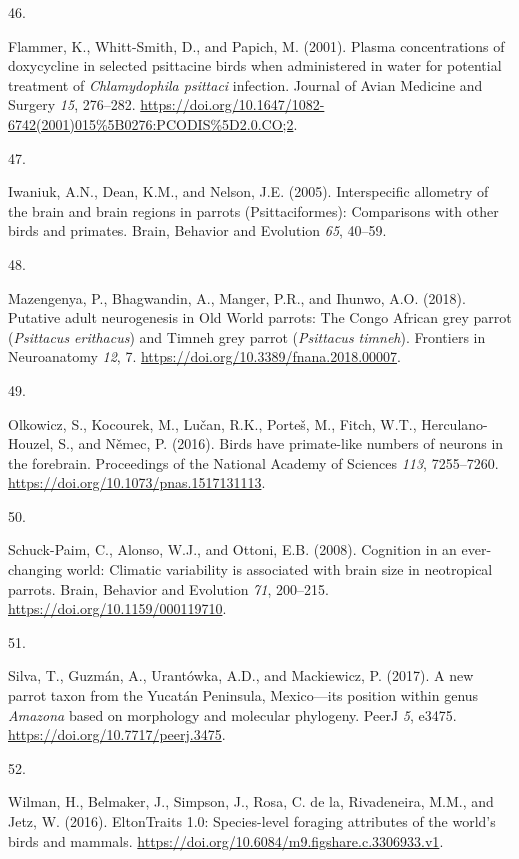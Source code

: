 \documentclass[
  man, donotrepeattitle,floatsintext]{apa6}
\newlength{\cslhangindent}
\newlength{\csllabelwidth}
\newlength{\cslentryspacingunit} %
\newenvironment{CSLReferences}[2] %
 {%
  \setlength{\parindent}{0pt}
  \ifodd #1
  \let\oldpar\par
  \def\par{\hangindent=\cslhangindent\oldpar}
  \fi
  \setlength{\parskip}{#2\cslentryspacingunit}
 }%
 {}
\newcommand{\CSLLeftMargin}[1]{\parbox[t]{\csllabelwidth}{#1}}
\newcommand{\CSLRightInline}[1]{\parbox[t]{\linewidth - \csllabelwidth}{#1}\break}
\begin{document}
\begin{CSLReferences}{0}{0}
\leavevmode{}%
\CSLLeftMargin{46. }%
\CSLRightInline{Flammer, K., Whitt-Smith, D., and Papich, M. (2001). Plasma concentrations of doxycycline in selected psittacine birds when administered in water for potential treatment of \emph{{C}hlamydophila psittaci} infection. Journal of Avian Medicine and Surgery \emph{15}, 276--282. \url{https://doi.org/10.1647/1082-6742(2001)015\%5B0276:PCODIS\%5D2.0.CO;2}.}

\leavevmode{}%
\CSLLeftMargin{47. }%
\CSLRightInline{Iwaniuk, A.N., Dean, K.M., and Nelson, J.E. (2005). Interspecific allometry of the brain and brain regions in parrots ({P}sittaciformes): Comparisons with other birds and primates. Brain, Behavior and Evolution \emph{65}, 40--59.}

\leavevmode{}%
\CSLLeftMargin{48. }%
\CSLRightInline{Mazengenya, P., Bhagwandin, A., Manger, P.R., and Ihunwo, A.O. (2018). Putative adult neurogenesis in {O}ld {W}orld parrots: The {C}ongo {A}frican grey parrot (\emph{{P}sittacus erithacus}) and {T}imneh grey parrot (\emph{{P}sittacus timneh}). Frontiers in Neuroanatomy \emph{12}, 7. \url{https://doi.org/10.3389/fnana.2018.00007}.}

\leavevmode{}%
\CSLLeftMargin{49. }%
\CSLRightInline{Olkowicz, S., Kocourek, M., Lučan, R.K., Porteš, M., Fitch, W.T., Herculano-Houzel, S., and Němec, P. (2016). Birds have primate-like numbers of neurons in the forebrain. Proceedings of the National Academy of Sciences \emph{113}, 7255--7260. \url{https://doi.org/10.1073/pnas.1517131113}.}

\leavevmode{}%
\CSLLeftMargin{50. }%
\CSLRightInline{Schuck-Paim, C., Alonso, W.J., and Ottoni, E.B. (2008). Cognition in an ever-changing world: Climatic variability is associated with brain size in neotropical parrots. Brain, Behavior and Evolution \emph{71}, 200--215. \url{https://doi.org/10.1159/000119710}.}

\leavevmode{}%
\CSLLeftMargin{51. }%
\CSLRightInline{Silva, T., Guzmán, A., Urantówka, A.D., and Mackiewicz, P. (2017). A new parrot taxon from the {Y}ucat{á}n {P}eninsula, {M}exico---its position within genus \emph{{A}mazona} based on morphology and molecular phylogeny. PeerJ \emph{5}, e3475. \url{https://doi.org/10.7717/peerj.3475}.}

\leavevmode{}%
\CSLLeftMargin{52. }%
\CSLRightInline{Wilman, H., Belmaker, J., Simpson, J., Rosa, C. de la, Rivadeneira, M.M., and Jetz, W. (2016). EltonTraits 1.0: Species-level foraging attributes of the world's birds and mammals. \url{https://doi.org/10.6084/m9.figshare.c.3306933.v1}.}


\end{CSLReferences}
\end{document}
